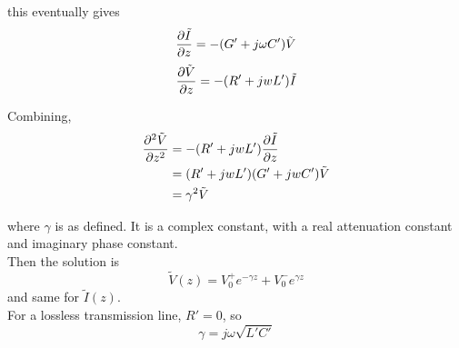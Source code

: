 \documentclass[12pt]{article}
\begin{document}
this eventually gives
$$\frac{\partial \tilde I}{\partial z} = -(G' + j\omega C')\tilde V$$
$$\frac{\partial \tilde V}{\partial z} = -(R' + jwL')\tilde I$$

Combining,
\begin{align*}
    \frac{\partial ^2\tilde V}{\partial z^2} &= -(R' + jwL')\frac{\partial \tilde I}{\partial z} \\
                          &= (R' + jwL')(G' + jwC')\tilde V \\
                          &= \gamma^2 \tilde V
\end{align*}

where $\gamma$ is as defined. It is a complex constant, with a real attenuation constant and imaginary phase constant. \\

Then the solution is
$$\tilde V(z) = V_0^+ e^{-\gamma z} + V_0^- e^{\gamma z}$$
and same for $\tilde I(z)$. \\
For a lossless transmission line, $R' = 0$, so
$$\gamma = j\omega\sqrt{L'C'}$$
\end{document}
